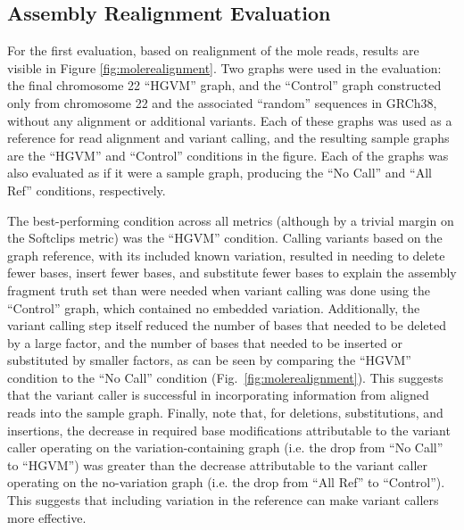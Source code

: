 \subsection{Assembly Realignment Evaluation}

For the first evaluation, based on realignment of the mole reads, results are visible in Figure \ref{fig:molerealignment}. Two graphs were used in the evaluation: the final chromosome 22 ``HGVM'' graph, and the ``Control'' graph constructed only from chromosome 22 and the associated ``random'' sequences in GRCh38, without any alignment or additional variants. Each of these graphs was used as a reference for read alignment and variant calling, and the resulting sample graphs are the ``HGVM'' and ``Control'' conditions in the figure. Each of the graphs was also evaluated as if it were a sample graph, producing the ``No Call'' and ``All Ref'' conditions, respectively.

The best-performing condition across all metrics (although by a trivial margin on the Softclips metric) was the ``HGVM'' condition. Calling variants based on the graph reference, with its included known variation, resulted in needing to delete fewer bases, insert fewer bases, and substitute fewer bases to explain the assembly fragment truth set than were needed when variant calling was done using the ``Control'' graph, which contained no embedded variation. Additionally, the variant calling step itself reduced the number of bases that needed to be deleted by a large factor, and the number of bases that needed to be inserted or substituted by smaller factors, as can be seen by comparing the ``HGVM'' condition to the ``No Call'' condition (Fig.~\ref{fig:molerealignment}). This suggests that the variant caller is successful in incorporating information from aligned reads into the sample graph. Finally, note that, for deletions, substitutions, and insertions, the decrease in required base modifications attributable to the variant caller operating on the variation-containing graph (i.e. the drop from ``No Call'' to ``HGVM'') was greater than the decrease attributable to the variant caller operating on the no-variation graph (i.e. the drop from ``All Ref'' to ``Control''). This suggests that including variation in the reference can make variant callers more effective.

